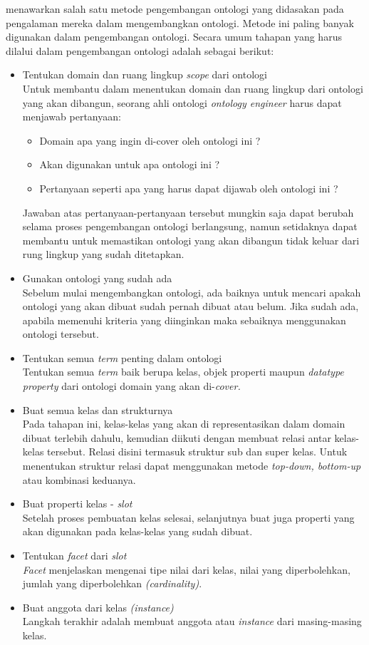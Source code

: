 \citet{noy_mcguinness} menawarkan salah satu metode pengembangan ontologi yang didasakan pada pengalaman mereka dalam mengembangkan ontologi. Metode ini paling banyak digunakan dalam pengembangan ontologi. Secara umum tahapan yang harus dilalui dalam pengembangan ontologi adalah sebagai berikut:
\begin{itemize}
	\item Tentukan domain dan ruang lingkup \emph{scope} dari ontologi\\
	Untuk membantu dalam menentukan domain dan ruang lingkup dari ontologi yang akan dibangun, seorang ahli ontologi \emph{ontology engineer} harus dapat menjawab pertanyaan:
	\begin{itemize}
		\item Domain apa yang ingin di-cover oleh ontologi ini ?
		\item Akan digunakan untuk apa ontologi ini ?
		\item Pertanyaan seperti apa yang harus dapat dijawab oleh ontologi ini ?
	\end{itemize}
	Jawaban atas pertanyaan-pertanyaan tersebut mungkin saja dapat berubah selama proses pengembangan ontologi berlangsung, namun setidaknya dapat membantu untuk memastikan ontologi yang akan dibangun tidak keluar dari rung lingkup yang sudah ditetapkan.
	\item Gunakan ontologi yang sudah ada\\
	Sebelum mulai mengembangkan ontologi, ada baiknya untuk mencari apakah ontologi yang akan dibuat sudah pernah dibuat atau belum. Jika sudah ada, apabila memenuhi kriteria yang diinginkan maka sebaiknya menggunakan ontologi tersebut.
	\item Tentukan semua \emph{term} penting dalam ontologi\\
	Tentukan semua \emph{term} baik berupa kelas, objek properti maupun \emph{datatype property} dari ontologi domain yang akan di-\em{cover}.
	\item Buat semua kelas dan strukturnya\\
	Pada tahapan ini, kelas-kelas yang akan di representasikan dalam domain dibuat terlebih dahulu, kemudian diikuti dengan membuat relasi antar kelas-kelas tersebut. Relasi disini termasuk struktur sub dan super kelas. Untuk menentukan struktur relasi dapat menggunakan metode \emph{top-down, bottom-up} atau kombinasi keduanya.
	\item Buat properti kelas - \emph{slot}\\
	Setelah proses pembuatan kelas selesai, selanjutnya buat juga properti yang akan digunakan pada kelas-kelas yang sudah dibuat.
	\item Tentukan \emph{facet} dari \emph{slot}\\
	\emph{Facet} menjelaskan mengenai tipe nilai dari kelas, nilai yang diperbolehkan, jumlah yang diperbolehkan \emph{(cardinality)}.
	\item Buat anggota dari kelas \emph{(instance)}\\
	Langkah terakhir adalah membuat anggota atau \emph{instance} dari masing-masing kelas.
\end{itemize}